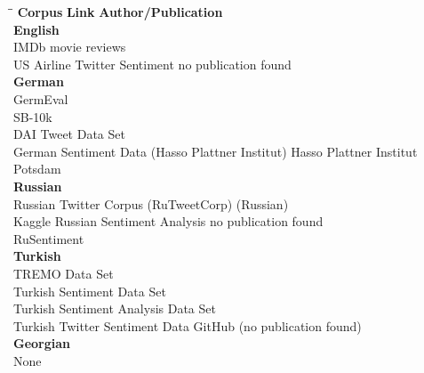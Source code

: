 \begin{tabbing}
	\hspace*{9cm}\=\hspace*{3cm}\=\kill
	\textbf{Corpus} \> \textbf{Link} \> \textbf{Author/Publication}
	\\[3mm]
	 \textbf{English}
	\\[2mm]
	IMDb movie reviews
		\> 	\href{https://www.kaggle.com/iarunava/imdb-movie-reviews-dataset}{}
		\>	\citep{Maas.2011}
	\\[2mm]
	US Airline Twitter Sentiment
		\> 	\href{https://www.kaggle.com/crowdflower/twitter-airline-sentiment}{}
		\>	no publication found
	\\[3mm]
	 \textbf{German}
	\\[1mm]
	GermEval
		\> 	\href{https://sites.google.com/view/germeval2017-absa/data}{}
		\>	\citep{Wojatzki.2017}
	\\[2mm]
	SB-10k
		\>	\href{https://www.spinningbytes.com/resources/}{}
		\>	\citep{Cieliebak.2017}
	\\[2mm]
	DAI Tweet Data Set
		\>	\href{http://www.dailab.de/~narr/sentimentdataset}{}
		\>	\citep{Narr.2012}
	\\[2mm]
	German Sentiment Data (Hasso Plattner Institut)
		\>	\href{www.hpi.uni-potsdam.de/fileadmin/hpi/ FG_Naumann/bachelorprojekte/BP2011N2/ GermanSentimentData.zip}
			{}
		\> Hasso Plattner Institut Potsdam
	\\[3mm]
	 \textbf{Russian}
	\\[2mm]
	Russian Twitter Corpus (RuTweetCorp)
		\>	\href{http://study.mokoron.com/}{}
		\>	\href{http://study.mokoron.com/wp-content/uploads/2014/02/rubtsova-kesw_paper-21.pdf}{}
			(Russian)
	\\[2mm]
	Kaggle Russian Sentiment Analysis
		\>	\href{https://www.kaggle.com/c/sentiment-analysis-in-russian/data}{}
		\> 	no publication found
	\\[2mm]
	RuSentiment
		\>	\href{http://text-machine.cs.uml.edu/projects/rusentiment/}{}
		\>	\citep{Rogers.2018}
	\\[3mm]
	 \textbf{Turkish}
	\\[2mm]
	TREMO Data Set
		\>	\href{https://journals.sagepub.com/doi/abs/10.1177/0165551518761014}{}
		\>	\citep{AlpTocoglu.2018}
	\\[2mm]
	Turkish Sentiment Data Set
		\>	\href{http://www.baskent.edu.tr/~msert/research/datasets/SentimentDatasetTR.html}{}
		\>	\citep{Hayran.2017}
	\\[2mm]
	Turkish Sentiment Analysis Data Set
		\>	\href{http://humirapps.cs.hacettepe.edu.tr/tsad.aspx}{}
		\>	\citep{Ucan.2016}
	\\[2mm]
	Turkish Twitter Sentiment Data
		\>	\href{https://github.com/hilalbenzer/turkish-sentiment-analysis}{}
		\>	GitHub (no publication found)
	\\[3mm]
	 \textbf{Georgian}
	\\[2mm]
	None
\end{tabbing}

